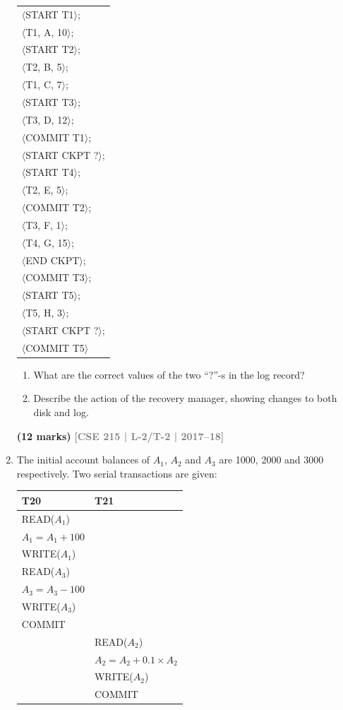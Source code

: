 \documentclass[12pt]{article}
\newcommand{\yr}[1]{\hfill\textcolor{gray}{\small\textbf{[#1]}}}
\newcommand{\mk}[1]{\textcolor{orange!70!black}{\small\textbf{(#1 marks)}}}
\begin{document}
\begin{enumerate}
\begin{center}
\small\ttfamily
\begin{tabular}{l}
$\langle$START T1$\rangle$; \\
$\langle$T1, A, 10$\rangle$; \\
$\langle$START T2$\rangle$; \\
$\langle$T2, B, 5$\rangle$; \\
$\langle$T1, C, 7$\rangle$; \\
$\langle$START T3$\rangle$; \\
$\langle$T3, D, 12$\rangle$; \\
$\langle$COMMIT T1$\rangle$; \\
$\langle$START CKPT ?\thinspace$\rangle$; \\
$\langle$START T4$\rangle$; \\
$\langle$T2, E, 5$\rangle$; \\
$\langle$COMMIT T2$\rangle$; \\
$\langle$T3, F, 1$\rangle$; \\
$\langle$T4, G, 15$\rangle$; \\
$\langle$END CKPT$\rangle$; \\
$\langle$COMMIT T3$\rangle$; \\
$\langle$START T5$\rangle$; \\
$\langle$T5, H, 3$\rangle$; \\
$\langle$START CKPT ?\thinspace$\rangle$; \\
$\langle$COMMIT T5$\rangle$
\end{tabular}
\end{center}

\begin{enumerate}
  \item What are the correct values of the two ``?''-s in the log record?
  \item Describe the action of the recovery manager, showing changes to both disk and log.
\end{enumerate}
\mk{12} \yr{CSE 215 | L-2/T-2 | 2017--18}


\item The initial account balances of $A_1$, $A_2$ and $A_3$ are 1000, 2000 and 3000 respectively. Two serial transactions are given:

\medskip
\begin{center}
\begin{tabular}{ll}
\toprule
\textbf{T20} & \textbf{T21}\\
\midrule
READ($A_1$) &\\
$A_1 = A_1 + 100$ &\\
WRITE($A_1$) &\\
READ($A_3$) &\\
$A_3 = A_3 - 100$ &\\
WRITE($A_3$) &\\
COMMIT &\\
& READ($A_2$)\\
& $A_2 = A_2 + 0.1 \times A_2$\\
& WRITE($A_2$)\\
& COMMIT\\
\bottomrule
\end{tabular}
\end{center}


\end{enumerate}
\end{document}
